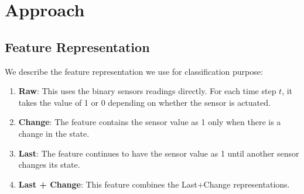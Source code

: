 \documentclass[11pt, oneside]{article}   	%
\begin{document}


\section{Approach}

\subsection{Feature Representation}
We describe the feature representation we use for classification purpose:
\begin{enumerate}
\item \textbf{Raw}: This uses the binary sensors readings directly. For each time step $t$, it takes the value of 1 or 0 depending on whether the sensor is actuated. 
\item \textbf{Change}: The feature contains the sensor value as 1 only when there is a change in the state. 
\item \textbf{Last}: The feature continues to have the sensor value as 1 until another sensor changes its state. 
\item \textbf{Last + Change}: This feature combines the Last+Change representations. 
\end{enumerate}
\end{document}
